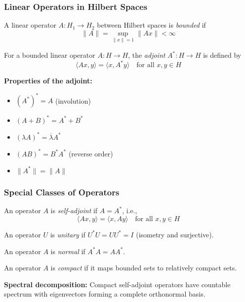 \documentclass[aspectratio=169,10pt]{beamer}
\begin{document}
\begin{frame}
\frametitle{Linear Operators in Hilbert Spaces}

\begin{definition}
A linear operator $A: H_1 \to H_2$ between Hilbert spaces is \emph{bounded} if
$$\|A\| = \sup_{\|x\|=1} \|Ax\| < \infty$$
\end{definition}

\vspace{0.3cm}

\begin{definition}
For a bounded linear operator $A: H \to H$, the \emph{adjoint} $A^*: H \to H$ is defined by
$$\langle Ax, y \rangle = \langle x, A^* y \rangle \quad \text{for all } x, y \in H$$
\end{definition}

\vspace{0.3cm}

\textbf{Properties of the adjoint:}
\begin{itemize}
\item $(A^*)^* = A$ (involution)
\item $(A + B)^* = A^* + B^*$
\item $(\lambda A)^* = \overline{\lambda} A^*$
\item $(AB)^* = B^* A^*$ (reverse order)
\item $\|A^*\| = \|A\|$
\end{itemize}
\end{frame}

\begin{frame}
\frametitle{Special Classes of Operators}

\begin{definition}
An operator $A$ is \emph{self-adjoint} if $A = A^*$, i.e.,
$$\langle Ax, y \rangle = \langle x, Ay \rangle \quad \text{for all } x, y \in H$$
\end{definition}

\begin{definition}
An operator $U$ is \emph{unitary} if $U^* U = U U^* = I$ (isometry and surjective).
\end{definition}

\begin{definition}
An operator $A$ is \emph{normal} if $A^* A = A A^*$.
\end{definition}

\begin{definition}
An operator $A$ is \emph{compact} if it maps bounded sets to relatively compact sets.
\end{definition}

\vspace{0.3cm}

\textbf{Spectral decomposition:} Compact self-adjoint operators have countable spectrum with eigenvectors forming a complete orthonormal basis.
\end{frame}
\end{document}
